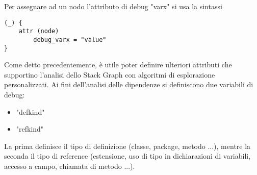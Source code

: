 Per assegnare ad un nodo l'attributo di debug "varx" si usa la sintassi

\begin{lstlisting}
(_) {
    attr (node)
        debug_varx = "value"
}
\end{lstlisting}

Come detto precedentemente, \`e utile poter definire ulteriori attributi che supportino l'analisi dello Stack Graph con algoritmi di esplorazione personalizzati.
Ai fini dell'analisi delle dipendenze si definiscono due variabili di debug:

\begin{itemize}
    \item "defkind"
    \item "refkind"
\end{itemize}

La prima definisce il tipo di definizione (classe, package, metodo ...), mentre la seconda il tipo di reference (estensione, uso di tipo in dichiarazioni di variabili, accesso a campo, chiamata di metodo ...).
